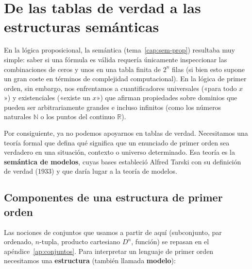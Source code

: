 \section{De las tablas de verdad a las estructuras semánticas}

En la lógica proposicional, la semántica (tema~\ref{cap:sem-prop}) resultaba
muy simple: saber si una fórmula es válida requería únicamente
inspeccionar las combinaciones de ceros y unos en una tabla finita de
$2^n$ filas (si bien esto supone un gran coste en términos de complejidad computacional). En la lógica de primer orden, sin embargo, nos enfrentamos a cuantificadores universales («para todo $x$») y existenciales («existe un $x$») que afirman propiedades sobre dominios que pueden ser arbitrariamente grandes e incluso infinitos (como los números naturales $\mathbb{N}$ o los puntos del continuo $\mathbb{R}$). 

Por consiguiente, ya no podemos apoyarnos en tablas de verdad. Necesitamos una teoría formal que defina qué significa que un enunciado de primer orden sea verdadero en una situación, contexto o universo determinado. Esa teoría es la \textbf{semántica de modelos}, cuyas bases estableció Alfred Tarski con su definición de verdad (1933) y que daría lugar a la teoría de modelos.

\subsection{Componentes de una estructura de primer orden}

Las nociones de conjuntos que usamos a partir de aquí (subconjunto, par ordenado, $n$-tupla, producto cartesiano $D^n$, función) se repasan en el apéndice~\ref{ap:conjuntos}. Para interpretar un lenguaje de primer orden necesitamos una \textbf{estructura} (también llamada \textbf{modelo}):

